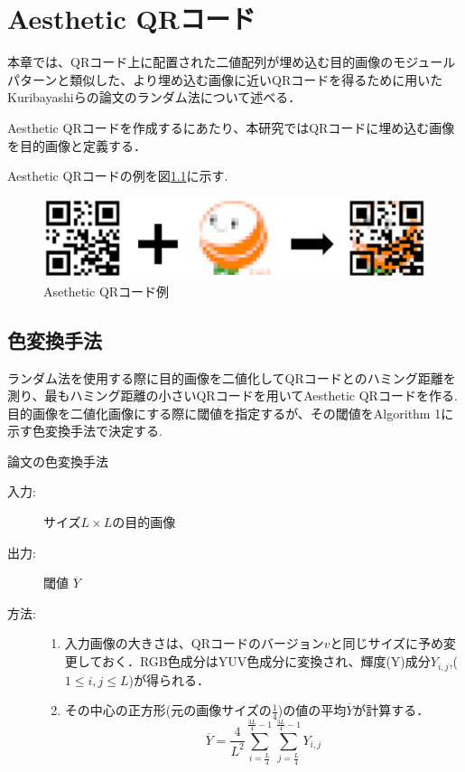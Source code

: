 \documentclass{thesis}
\begin{document}

\chapter{Aesthetic QRコード}
\label{chap:3}

本章では、QRコード上に配置された二値配列が埋め込む目的画像のモジュールパターンと類似した、より埋め込む画像に近いQRコードを得るために用いたKuribayashiらの論文\cite{KURI}のランダム法について述べる．

Aesthetic QRコードを作成するにあたり、本研究ではQRコードに埋め込む画像を目的画像と定義する．

Aesthetic QRコードの例を図\ref{As}に示す.

\begin{figure}[H]
      \centering
      \includegraphics[width=0.7\linewidth]{pic/As.eps}
      \caption{Asethetic QRコード例}
      \label{As}
\end{figure}



\section{色変換手法}


ランダム法を使用する際に目的画像を二値化してQRコードとのハミング距離を測り、最もハミング距離の小さいQRコードを用いてAesthetic QRコードを作る.
目的画像を二値化画像にする際に閾値を指定するが、その閾値をAlgorithm 1に示す色変換手法で決定する.


\begin{algorithm}                      
\caption{論文\cite{KURI}の色変換手法}         
\label{alg:alg1} 
\begin{description}
\item[入力:] サイズ$L \times L$の目的画像
\item[出力:] 閾値 $\overline{Y}$
\item[方法:]
\begin{enumerate}
\item 入力画像の大きさは、QRコードのバージョン$v$と同じサイズに予め変更しておく．RGB色成分はYUV色成分に変換され、輝度(Y)成分$Y_{i,j}$,($1 \leq i,j \leq L$)が得られる．
\item その中心の正方形(元の画像サイズの$\frac{1}{4}$)の値の平均$\overline{Y}$が計算する．
\begin{equation}
\overline{Y} = \frac{4}{L^2} \sum_{i = \frac{L}{4}}^{\frac{3L}{4} - 1} \sum_{j = \frac{L}{4}}^{\frac{3L}{4} - 1} Y_{i,j}
\label{eq:pol4}
\end{equation}
\end{enumerate}
\end{description}
\end{algorithm}  
\end{document}
